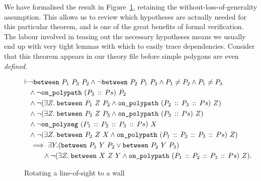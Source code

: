 We have formalised the result in Figure~\ref{fig:RotateToWall}, retaining the without-loss-of-generality assumption. This allows us to review which hypotheses are actually needed for this particular theorem, and is one of the great benefits of formal verification. The labour involved in teasing out the necessary hypotheses means we usually end up with very tight lemmas with which to easily trace dependencies. Consider that this theorem appears in our theory file before simple polygons are even \emph{defined}.

\begin{figure}
\begin{equation}\label{eq:RotateToWall}
  \begin{split}
\vdash&\neg\texttt{between}\ P_1\ P_3\ P_2 \wedge \neg\texttt{between}\ P_2\ P_1\ P_3 \wedge P_1 \neq P_2 \wedge P_1 \neq P_3\\
    &\wedge\neg\texttt{on\_polypath}\ (P_3\,::\,Ps)\ P_2\\
    &\wedge\neg(\exists Z.\; \texttt{between}\ P_1\ Z\ P_2 \wedge \texttt{on\_polypath}\ (P_2\,::\,P_3\,::\,Ps)\ Z)\\
    &\wedge\neg(\exists Z.\; \texttt{between}\ P_2\ Z\ P_3 \wedge \texttt{on\_polypath}\ (P_3\,::\,Ps)\ Z)\\
    &\wedge\neg\texttt{on\_polyseg}\ (P_1\,::\,P_2\,::\,P_3\,::\,Ps)\ X\\
    &\wedge\neg(\exists Z.\; \texttt{between}\ P_2\ Z\ X \wedge \texttt{on\_polypath}\ (P_1\,::\,P_2\,::\,P_3\,::\,Ps)\ Z)\\
    &\implies\exists Y. (\texttt{between}\ P_1\ Y\ P_2 \vee \texttt{between}\ P_2\ Y\ P_3)\\
    &\qquad \wedge \neg(\exists Z.\; \texttt{between}\ X\ Z\ Y \wedge \texttt{on\_polypath}\ (P_1\,::\,P_2\,::\,P_3\,::\,Ps)\ Z).
  \end{split}
\end{equation}
\caption{Rotating a line-of-sight to a wall}
\label{fig:RotateToWall}
\end{figure}

